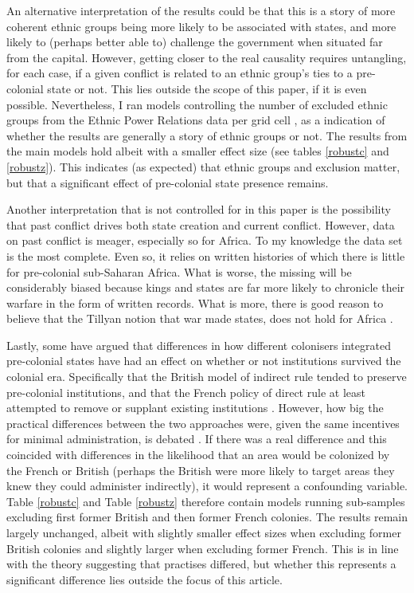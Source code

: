 An alternative interpretation of the results could be that this is a story of
more coherent ethnic groups being more likely to be associated with states, and
more likely to (perhaps better able to) challenge the government when situated
far from the capital. However, getting closer to the real causality requires
untangling, for each case, if a given conflict is related to an ethnic group's
ties to a pre-colonial state or not. This lies outside the scope of this paper,
if it is even possible. Nevertheless, I ran models controlling the number of
excluded ethnic groups from the Ethnic Power Relations data per grid cell
\citep{Vogt2015}, as a indication of whether the results are generally a story of
ethnic groups or not. The results from the main models hold albeit with a smaller
effect size (see tables \ref{robustc} and \ref{robustz}). This indicates (as
expected) that ethnic groups and exclusion matter, but that a significant effect
of pre-colonial state presence remains.

Another interpretation that is not controlled for in this paper is the
possibility that past conflict drives both state creation and current conflict.
However, data on past conflict is meager, especially so for Africa. To my
knowledge the \citet{Brecke1999} data set is the most complete. Even so, it
relies on written histories of which there is little for pre-colonial
sub-Saharan Africa. What is worse, the missing will be considerably biased
because kings and states are far more likely to chronicle their warfare in the
form of written records. What is more, there is good reason to believe that the
Tillyan notion that war made states, does not hold for Africa
\citep{Dincecco_2019}. 

Lastly, some have argued that differences in how different colonisers integrated
pre-colonial states have had an effect on whether or not institutions survived
the colonial era. Specifically that the British model of indirect rule tended to
preserve pre-colonial institutions, and that the French policy of direct rule at
least attempted to remove or supplant existing institutions \citep{Paine2019}.
However, how big the practical differences between the two approaches were,
given the same incentives for minimal administration, is debated
\citep{boone2014property, englebert2013inside}. If there was a real difference
and this coincided with differences in the likelihood that an area would be
colonized by the French or British (perhaps the British were more likely to
target areas they knew they could administer indirectly), it would represent a
confounding variable. Table \ref{robustc} and Table \ref{robustz} therefore
contain models running sub-samples excluding first former British and then
former French colonies. The results remain largely unchanged, albeit with
slightly smaller effect sizes when excluding former British colonies and
slightly larger when excluding former French. This is in line with the theory
suggesting that practises differed, but whether this represents a significant
difference lies outside the focus of this article.


